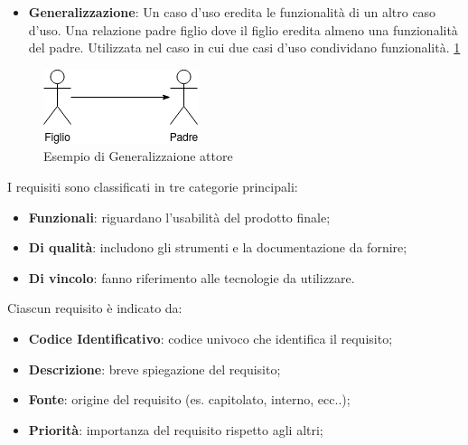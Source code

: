 \begin{itemize}
    \begin{itemize}
        \item \textbf{Generalizzazione}: Un caso d'uso eredita le funzionalità di un altro caso d'uso. Una relazione padre figlio dove il figlio eredita almeno una funzionalità del padre. Utilizzata nel caso in cui due casi d'uso condividano funzionalità. \ref{fig:generalizzazione_attore}
    \end{itemize}

    \begin{figure}[H]
        \centering
        \includegraphics{../../../img/Generalizzazione_Attori.png}
        \caption{Esempio di Generalizzaione attore}
        \label{fig:generalizzazione_attore}
    \end{figure}

\end{itemize}


I requisiti sono classificati in tre categorie principali:  
\begin{itemize}
    \item \textbf{Funzionali}: riguardano l'usabilità del prodotto finale;  
    \item \textbf{Di qualità}: includono gli strumenti e la documentazione da fornire;  
    \item \textbf{Di vincolo}: fanno riferimento alle tecnologie da utilizzare.
\end{itemize}
Ciascun requisito è indicato da:
\begin{itemize}
    \item \textbf{Codice Identificativo}: codice univoco che identifica il requisito;
    \item \textbf{Descrizione}: breve spiegazione del requisito;
    \item \textbf{Fonte}: origine del requisito (es. capitolato, interno, ecc..);
    \item \textbf{Priorità}: importanza del requisito rispetto agli altri;
\end{itemize} 

